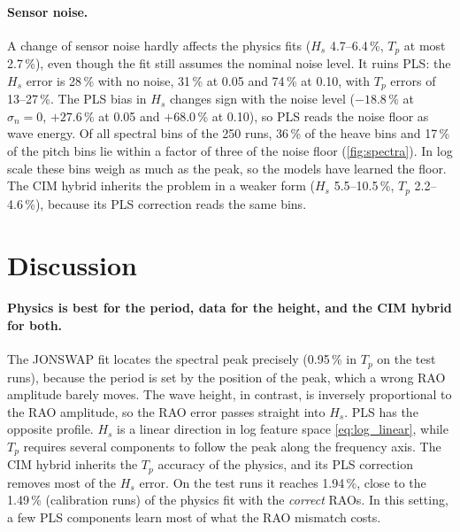 \documentclass[11pt,a4paper]{article}
\newcommand{\Hs}{H_{s}}
\newcommand{\Tp}{T_{p}}
\newcommand{\pct}[1]{#1\,\%}
\begin{document}
\paragraph{Sensor noise.}
A change of sensor noise hardly affects the physics fits ($\Hs$ 4.7--6.4\,\%, $\Tp$ at most
\pct{2.7}), even though the fit still assumes the nominal noise level. It ruins PLS: the $\Hs$
error is \pct{28} with no noise, \pct{31} at 0.05 and \pct{74} at 0.10, with $\Tp$ errors of
13--27\,\%. The PLS bias in $\Hs$ changes sign with the noise level ($-18.8$\,\% at
$\sigma_n = 0$, $+27.6$\,\% at 0.05 and $+68.0$\,\% at 0.10), so PLS reads the noise floor as
wave energy. Of all spectral bins of the 250 runs, \pct{36} of the heave bins and \pct{17} of
the pitch bins lie within a factor of three of the noise floor (\cref{fig:spectra}). In log scale
these bins weigh as much as the peak, so the models have learned the floor. The CIM hybrid inherits
the problem in a weaker form ($\Hs$ 5.5--10.5\,\%, $\Tp$ 2.2--4.6\,\%), because its PLS
correction reads the same bins.

\section{Discussion}
\label{sec:discussion}

\paragraph{Physics is best for the period, data for the height, and the CIM hybrid for both.}
The JONSWAP fit locates the spectral peak precisely (\pct{0.95} in $\Tp$ on the test runs),
because the period is set by the position of the peak, which a wrong RAO amplitude barely
moves. The wave height, in contrast, is inversely proportional to the RAO amplitude, so the RAO
error passes straight into $\Hs$. PLS has the opposite profile. $\Hs$ is a linear direction in
log feature space \cref{eq:log_linear}, while $\Tp$ requires several components to follow the
peak along the frequency axis. The CIM hybrid inherits the $\Tp$ accuracy of the physics, and its
PLS correction removes most of the $\Hs$ error. On the test runs it reaches \pct{1.94}, close to
the \pct{1.49} (calibration runs) of the physics fit with the \emph{correct} RAOs. In this setting, a few PLS components learn most of what the RAO
mismatch costs.
\end{document}
